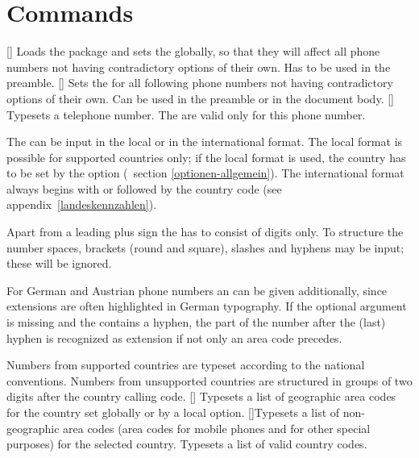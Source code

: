 \documentclass[numbers=noenddot]{scrreprt}
\newcommand*\vglAbschnitt[1]{(\cf\ section \ref{#1})}
\newcommand*\sieheAnhang[1]{(see appendix~\ref{#1})}
\begin{document}
\section{Commands}
\begin{Befehlsliste}
[]
Loads the package and sets the  globally, so that they will affect all phone numbers not having contradictory options of their own. Has to be used in the preamble.
[]
Sets the  for all following phone numbers not having contradictory options of their own. Can be used in the preamble or in the document body.
[]
Typesets a telephone number. The  are valid only for this phone number.

The  can be input in the local or in the international format. The local format is possible for supported countries only; if the local format is used, the country has to be set by the
option
\vglAbschnitt{optionen-allgemein}.
The international format always begins with
\code{+}
or
followed by the country code
\sieheAnhang{landeskennzahlen}.

Apart from a leading plus sign the  has to consist of digits only. To structure the number spaces, brackets (round and square), slashes and hyphens may be input; these will be ignored.

For German and Austrian phone numbers an  can be given additionally, since extensions are often highlighted in German typography. If the optional argument is missing and the  contains a hyphen, the part of the number after the (last) hyphen is recognized as extension if not only an area code precedes.

Numbers from supported countries are typeset according to the national conventions. Numbers from unsupported countries are structured in groups of two digits after the country calling code.
[]
Typesets a list of geographic area codes for the country set globally or by a local option.
[]{Typesets a list of non-geographic area codes (area codes for mobile phones and for other special purposes) for the selected country.}
Typesets a list of valid country codes.
\end{Befehlsliste}
\end{document}
